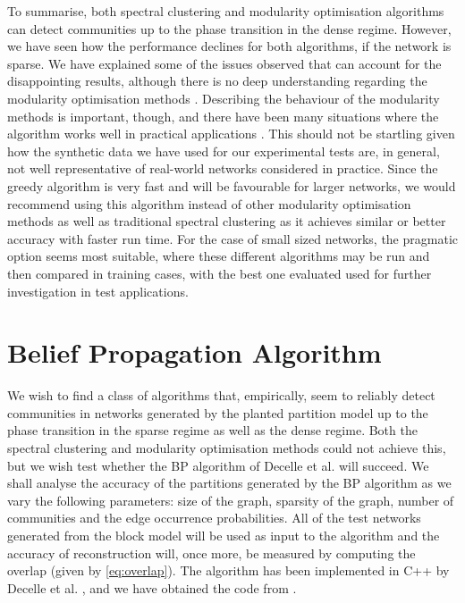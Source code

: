 To summarise, both spectral clustering and modularity optimisation algorithms can detect communities up to the phase transition in the dense regime.
However, we have seen how the performance declines for both algorithms, if the network is sparse.
We have explained some of the issues observed that can account for the disappointing results, although there is no deep understanding regarding the modularity optimisation methods \cite{For10}.
Describing the behaviour of the modularity methods is important, though, and there have been many situations where the algorithm works well in practical applications \cite{New06a,New06b,For10,GMC10}.
This should not be startling given how the synthetic data we have used for our experimental tests are, in general, not well representative of real-world networks considered in practice.
Since the greedy algorithm is very fast and will be favourable for larger networks, we would recommend using this algorithm instead of other modularity optimisation methods as well as traditional spectral clustering as it achieves similar or better accuracy with faster run time.
For the case of small sized networks, the pragmatic option seems most suitable, where these different algorithms may be run and then compared in training cases, with the best one evaluated used for further investigation in test applications.


\section{Belief Propagation Algorithm}
\label{sec:beliefPropagationAlgorithmTest}

We wish to find a class of algorithms that, empirically, seem to reliably detect communities in networks generated by the planted partition model up to the phase transition in the sparse regime as well as the dense regime.
Both the spectral clustering and modularity optimisation methods could not achieve this, but we wish test whether the BP algorithm of Decelle et al. \cite{DKM+13} will succeed.
We shall analyse the accuracy of the partitions generated by the BP algorithm as we vary the following parameters: size of the graph, sparsity of the graph, number of communities and the edge occurrence probabilities.
All of the test networks generated from the block model will be used as input to the algorithm and the accuracy of reconstruction will, once more, be measured by computing the overlap (given by \cref{eq:overlap}).
The algorithm has been implemented in C++ by Decelle et al. \cite{DKM+13}, and we have obtained the code from \cite{ModeNet}.

